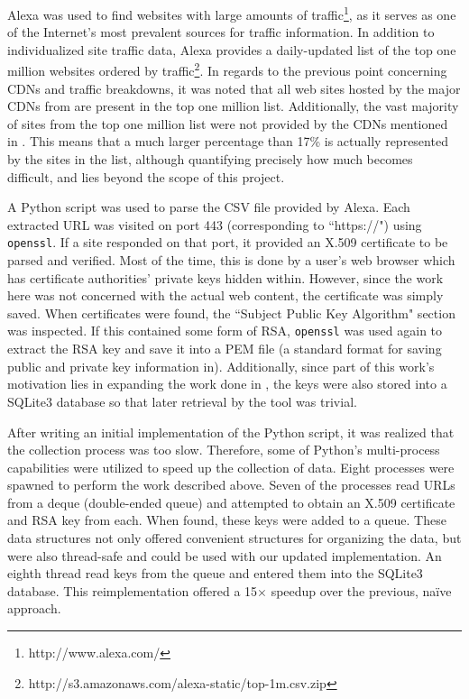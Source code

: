 \documentclass[12pt]{ucthesis}
\begin{document}
Alexa was used to find websites with large amounts of
traffic\footnote{http://www.alexa.com/}, as it serves as one of the Internet's
most prevalent sources for traffic information. In addition to individualized
site traffic data, Alexa provides a daily-updated list of the top one million
websites ordered by
traffic\footnote{http://s3.amazonaws.com/alexa-static/top-1m.csv.zip}. In
regards to the previous point concerning CDNs and traffic breakdowns, it was
noted that all web sites hosted by the major CDNs from
\cite{labovitz2011internet} are present in the top one million list.
Additionally, the vast majority of sites from the top one million list were
not provided by the CDNs mentioned in \cite{labovitz2011internet}. This means
that a much larger percentage than 17\% is actually represented by the sites
in the list, although quantifying precisely how much becomes difficult, and
lies beyond the scope of this project.

A Python script was used to parse the CSV file provided by Alexa. Each
extracted URL was visited on port 443 (corresponding to ``https://") using 
\texttt{openssl}. If a site responded on that port, it provided an X.509
certificate to be parsed and verified. Most of the time, this is done by a
user's web browser which has certificate authorities' private keys hidden
within. However, since the work here was not concerned with the actual web
content, the certificate was simply saved. When certificates were found, the
``Subject Public Key Algorithm" section was inspected. If this contained some
form of RSA, \texttt{openssl} was used again to extract the RSA key and save
it into a PEM file (a standard format for saving public and private key
information in). Additionally, since part of this work's motivation lies in
expanding the work done in \cite{scharfglass2012breaking}, the keys were also
stored into a SQLite3 database so that later retrieval by the tool was trivial.

After writing an initial implementation of the Python script, it was realized
that the collection process was too slow. Therefore, some of Python's
multi-process capabilities were utilized to speed up the collection of data.
Eight processes were spawned to perform the work described above. Seven of the
processes read URLs from a deque (double-ended queue) and attempted to obtain
an X.509 certificate and RSA key from each. When found, these keys were added
to a queue. These data structures not only offered convenient structures for
organizing the data, but were also thread-safe and could be used with our
updated implementation. An eighth thread read keys from the queue and entered
them into the SQLite3 database. This reimplementation offered a 15$\times$
speedup over the previous, na\"{i}ve approach.
\end{document}
